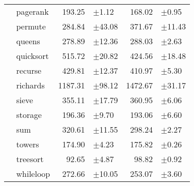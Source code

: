 \begin{tabular}{llrlrl}
 & pagerank & 193.25 & \scriptsize\textcolor{gray!60}{$\pm$1.12} & 168.02 & \scriptsize\textcolor{gray!60}{$\pm$0.95} \\
 & permute & 284.84 & \scriptsize\textcolor{gray!60}{$\pm$43.08} & 371.67 & \scriptsize\textcolor{gray!60}{$\pm$11.43} \\
 & queens & 278.89 & \scriptsize\textcolor{gray!60}{$\pm$12.36} & 288.03 & \scriptsize\textcolor{gray!60}{$\pm$2.63} \\
 & quicksort & 515.72 & \scriptsize\textcolor{gray!60}{$\pm$20.82} & 424.56 & \scriptsize\textcolor{gray!60}{$\pm$18.48} \\
 & recurse & 429.81 & \scriptsize\textcolor{gray!60}{$\pm$12.37} & 410.97 & \scriptsize\textcolor{gray!60}{$\pm$5.30} \\
 & richards & 1187.31 & \scriptsize\textcolor{gray!60}{$\pm$98.12} & 1472.67 & \scriptsize\textcolor{gray!60}{$\pm$31.17} \\
 & sieve & 355.11 & \scriptsize\textcolor{gray!60}{$\pm$17.79} & 360.95 & \scriptsize\textcolor{gray!60}{$\pm$6.06} \\
 & storage & 196.36 & \scriptsize\textcolor{gray!60}{$\pm$9.70} & 193.06 & \scriptsize\textcolor{gray!60}{$\pm$6.60} \\
 & sum & 320.61 & \scriptsize\textcolor{gray!60}{$\pm$11.55} & 298.24 & \scriptsize\textcolor{gray!60}{$\pm$2.27} \\
 & towers & 174.90 & \scriptsize\textcolor{gray!60}{$\pm$4.23} & 175.82 & \scriptsize\textcolor{gray!60}{$\pm$0.26} \\
 & treesort & 92.65 & \scriptsize\textcolor{gray!60}{$\pm$4.87} & 98.82 & \scriptsize\textcolor{gray!60}{$\pm$0.92} \\
 & whileloop & 272.66 & \scriptsize\textcolor{gray!60}{$\pm$10.05} & 253.07 & \scriptsize\textcolor{gray!60}{$\pm$3.60} \\
\bottomrule
\end{tabular}
